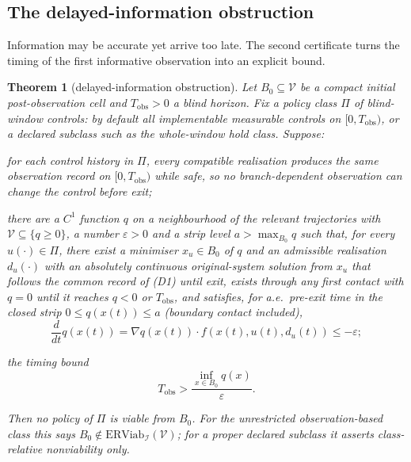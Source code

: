\documentclass[11pt,a4paper]{article}
\theoremstyle{plain}
\newtheorem{theorem}{Theorem}[section]
\theoremstyle{definition}
\theoremstyle{remark}
\newcommand{\ERViab}{\mathrm{ERViab}}
\newcommand{\cV}{\mathcal{V}}
\newcommand{\cI}{\mathcal{I}}
\newcommand{\Tobs}{T_{\mathrm{obs}}}
\newcommand{\hyp}[1]{\textup{(#1)}}
\begin{document}
\subsection{The delayed-information obstruction}\label{sec:delayed}

Information may be accurate yet arrive too late. The second certificate turns the timing of the first informative observation into an explicit bound.

\begin{theorem}[delayed-information obstruction]\label{thm:delayed}
Let $B_0\subseteq\cV$ be a compact initial post-observation cell and $\Tobs>0$ a blind horizon. Fix a policy class $\Pi$ of \emph{blind-window controls}: by default all implementable measurable controls on $[0,\Tobs)$, or a declared subclass such as the whole-window hold class. Suppose:
\begin{description}[leftmargin=2.6em,itemsep=1pt]
\item[\hyp{D1}] for each control history in $\Pi$, every compatible realisation produces the same observation record on $[0,\Tobs)$ while safe, so no branch-dependent observation can change the control before exit;
\item[\hyp{D2}] there are a $C^1$ function $q$ on a neighbourhood of the relevant trajectories with $\cV\subseteq\{q\ge0\}$, a number $\varepsilon>0$ and a strip level $a>\max_{B_0}q$ such that, \emph{for every} $u(\cdot)\in\Pi$, there exist a minimiser $x_u\in B_0$ of $q$ and an admissible realisation $d_u(\cdot)$ with an absolutely continuous original-system solution from $x_u$ that follows the common record of \hyp{D1} until exit, exists through any first contact with $q=0$ until it reaches $q<0$ or $\Tobs$, and satisfies, for a.e.\ pre-exit time in the closed strip $0\le q(x(t))\le a$ (boundary contact included),
\begin{equation}\label{eq:drift}
\frac{d}{dt}q(x(t))=\nabla q(x(t))\cdot f(x(t),u(t),d_u(t))\le-\varepsilon;
\end{equation}
\item[\hyp{D3}] the timing bound
\begin{equation}\label{eq:timing}
\Tobs>\frac{\inf_{x\in B_0}q(x)}{\varepsilon}.
\end{equation}
\end{description}
Then no policy of $\Pi$ is viable from $B_0$. For the unrestricted observation-based class this says $B_0\notin\ERViab_\cI(\cV)$; for a proper declared subclass it asserts class-relative nonviability only.
\end{theorem}
\end{document}
